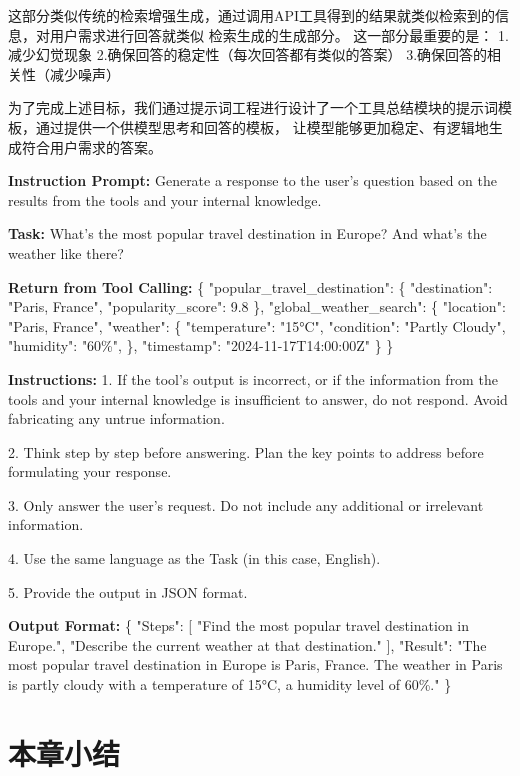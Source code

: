 这部分类似传统的检索增强生成，通过调用API工具得到的结果就类似检索到的信息，对用户需求进行回答就类似
检索生成的生成部分。
这一部分最重要的是：
1.减少幻觉现象
2.确保回答的稳定性（每次回答都有类似的答案）
3.确保回答的相关性（减少噪声）

为了完成上述目标，我们通过提示词工程进行设计了一个工具总结模块的提示词模板，通过提供一个供模型思考和回答的模板，
让模型能够更加稳定、有逻辑地生成符合用户需求的答案。


\begin{center}
\begin{tcolorbox}[colback=bgcolor, colframe=black, width=0.8\textwidth, boxrule=0.5mm, 
coltitle=white, colbacktitle=titlecolor, title=An Example for Response Generation with GPT-4]


\textbf{Instruction Prompt:} Generate a response to the user's question based on the results from the tools and your internal knowledge.

\textbf{Task:} What's the most popular travel destination in Europe? And what's the weather like there?

\textbf{Return from Tool Calling:} 
\{%
    "popular\_travel\_destination": \{%
        "destination": "Paris, France",%
        "popularity\_score": 9.8%
    \},%
    "global\_weather\_search": \{%
        "location": "Paris, France",%
        "weather": \{%
            "temperature": "15°C",%
            "condition": "Partly Cloudy",%
            "humidity": "60\%",%
        \},%
        "timestamp": "2024-11-17T14:00:00Z"%
    \}%
\}

\textbf{Instructions:}
1. If the tool's output is incorrect, or if the information from the tools and your internal knowledge is insufficient to answer, do not respond. Avoid fabricating any untrue information.

2. Think step by step before answering. Plan the key points to address before formulating your response.

3. Only answer the user's request. Do not include any additional or irrelevant information.

4. Use the same language as the Task (in this case, English).

5. Provide the output in JSON format.

\textbf{Output Format:}  
\{%
    "Steps": [%
        "Find the most popular travel destination in Europe.",%
        "Describe the current weather at that destination."%
    ],%
    "Result": "The most popular travel destination in Europe is Paris, France. The weather in Paris is partly cloudy with a temperature of 15°C, a humidity level of 60\%."%
\}

\end{tcolorbox}
\end{center}

\section{本章小结}
\label{sec:summary_chap4}